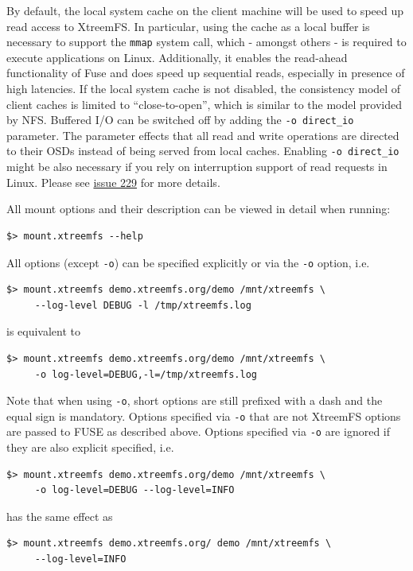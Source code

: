 \documentclass[a4paper,10pt]{book}
\begin{document}
By default, the local system cache on the client machine will be used to speed up read access to XtreemFS. In particular, using the cache as a local buffer is necessary to support the \texttt{mmap} system call, which - amongst others - is required to execute applications on Linux. Additionally, it enables the read-ahead functionality of Fuse and does speed up sequential reads, especially in presence of high latencies. If the local system cache is not disabled, the consistency model of client caches is limited to ``close-to-open'', which is similar to the model provided by NFS. Buffered I/O can be switched off by adding the \texttt{-o direct\_io} parameter. The parameter effects that all read and write operations are directed to their OSDs instead of being served from local caches. Enabling \texttt{-o direct\_io} might be also necessary if you rely on interruption support of read requests in Linux. Please see \href{http://code.google.com/p/xtreemfs/issues/detail?id=229}{issue 229} for more details.

All mount options and their description can be viewed in detail when running:
\begin{verbatim}
$> mount.xtreemfs --help
\end{verbatim}

All options (except \texttt{-o}) can be specified explicitly or via the \texttt{-o} option, i.e.
\begin{verbatim}
$> mount.xtreemfs demo.xtreemfs.org/demo /mnt/xtreemfs \
     --log-level DEBUG -l /tmp/xtreemfs.log
\end{verbatim}
is equivalent to
\begin{verbatim}
$> mount.xtreemfs demo.xtreemfs.org/demo /mnt/xtreemfs \
     -o log-level=DEBUG,-l=/tmp/xtreemfs.log
\end{verbatim}
Note that when using \texttt{-o}, short options are still prefixed with a dash and the equal sign is mandatory. Options specified via \texttt{-o} that are not XtreemFS options are passed to FUSE as described above. Options specified via \texttt{-o} are ignored if they are also explicit specified, i.e.
\begin{verbatim}
$> mount.xtreemfs demo.xtreemfs.org/demo /mnt/xtreemfs \
     -o log-level=DEBUG --log-level=INFO
\end{verbatim}
has the same effect as
\begin{verbatim}
$> mount.xtreemfs demo.xtreemfs.org/ demo /mnt/xtreemfs \
     --log-level=INFO
\end{verbatim}
\end{document}
